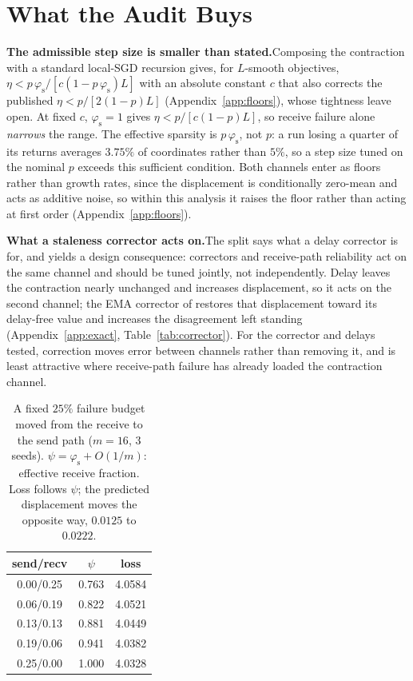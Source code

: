 \documentclass{article}
\theoremstyle{plain}
\newcommand{\ps}{\varphi_{\mathrm{s}}}
\begin{document}
\vspace{-18pt}\section{What the Audit Buys}\label{sec:buys}\vspace{-10pt}

\textbf{The admissible step size is smaller than stated.}\quad Composing the
contraction with a standard local-SGD recursion gives, for $L$-smooth
objectives, $\eta < p\,\ps/[c(1-p\,\ps)L]$ with an absolute constant $c$ that
also corrects the published $\eta<p/[2(1-p)L]$ (Appendix~\ref{app:floors}),
whose tightness \citet{ajanthan2026asyncmesh} leave open. At fixed $c$,
$\ps{=}1$ gives $\eta<p/[c(1-p)L]$, so receive failure alone \emph{narrows} the
range. The effective sparsity is $p\,\ps$, not $p$: a run
losing a quarter of its returns averages $3.75\%$ of coordinates rather than
$5\%$, so a step size tuned on the nominal $p$ exceeds this sufficient
condition. Both channels enter as floors rather than growth
rates, since the displacement is conditionally zero-mean and acts as additive
noise, so within this analysis it raises the floor rather than acting at first
order (Appendix~\ref{app:floors}).

\textbf{What a staleness corrector acts on.}\quad The split says what a delay
corrector is for, and yields a design consequence: correctors and receive-path
reliability act on the same channel and should be tuned jointly, not
independently. Delay leaves the contraction nearly unchanged and increases
displacement, so it acts on the second channel; the EMA corrector of
\citet{ajanthan2026asyncmesh} restores that displacement toward its delay-free
value and increases the disagreement left standing (Appendix~\ref{app:exact},
Table~\ref{tab:corrector}). For the corrector and delays tested, correction
moves error between channels rather than removing it, and is least attractive
where receive-path failure has already loaded the contraction channel.

\begin{table}
\vspace{-22pt}
\centering\small
\caption{A fixed $25\%$ failure budget moved from the receive to the send path
($m{=}16$, 3 seeds). $\psi{=}\ps{+}O(1/m)$: effective receive fraction.
Loss follows $\psi$; the predicted displacement moves the opposite way,
$0.0125$ to $0.0222$.}
\label{tab:asymmetry}
\begin{tabular}{ccc}
\toprule
send/recv & $\psi$ & loss \\
\midrule
0.00/0.25 & 0.763 & 4.0584 \\
0.06/0.19 & 0.822 & 4.0521 \\
0.13/0.13 & 0.881 & 4.0449 \\
0.19/0.06 & 0.941 & 4.0382 \\
0.25/0.00 & 1.000 & 4.0328 \\
\bottomrule
\end{tabular}
\vspace{-24pt}
\end{table}
\end{document}
